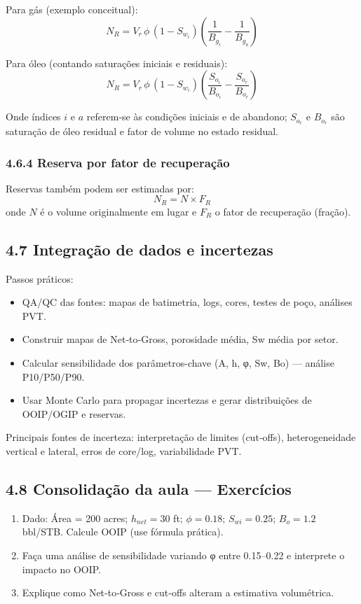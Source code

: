 \documentclass[11pt,a4paper]{article}
\begin{document}
Para gás (exemplo conceitual):
$$
N_R = V_r\,\phi\,(1-S_{w_i})\left(\frac{1}{B_{g_i}} - \frac{1}{B_{g_a}}\right)
$$

Para óleo (contando saturações iniciais e residuais):
$$
N_R = V_r\,\phi\,(1-S_{w_i})\left(\frac{S_{o_i}}{B_{o_i}} - \frac{S_{o_r}}{B_{o_r}}\right)
$$

Onde índices $i$ e $a$ referem‑se às condições iniciais e de abandono; $S_{o_r}$ e $B_{o_r}$ são saturação de óleo residual e fator de volume no estado residual.

\subsubsection{4.6.4 Reserva por fator de recuperação}
Reservas também podem ser estimadas por:
$$
N_R = N \times F_R
$$
onde $N$ é o volume originalmente em lugar e $F_R$ o fator de recuperação (fração).

\subsection{4.7 Integração de dados e incertezas}
Passos práticos:
\begin{itemize}
\item QA/QC das fontes: mapas de batimetria, logs, cores, testes de poço, análises PVT.
\item Construir mapas de Net‑to‑Gross, porosidade média, Sw média por setor.
\item Calcular sensibilidade dos parâmetros-chave (A, h, φ, Sw, Bo) — análise P10/P50/P90.
\item Usar Monte Carlo para propagar incertezas e gerar distribuições de OOIP/OGIP e reservas.
\end{itemize}

Principais fontes de incerteza: interpretação de limites (cut‑offs), heterogeneidade vertical e lateral, erros de core/log, variabilidade PVT.

\subsection{4.8 Consolidação da aula — Exercícios}
\begin{enumerate}
\item Dado: Área = 200 acres; $h_{net} = 30$ ft; $\phi = 0.18$; $S_{wi} = 0.25$; $B_o = 1.2$ bbl/STB. Calcule OOIP (use fórmula prática).
\item Faça uma análise de sensibilidade variando φ entre 0.15–0.22 e interprete o impacto no OOIP.
\item Explique como Net‑to‑Gross e cut‑offs alteram a estimativa volumétrica.
\end{enumerate}
\end{document}
